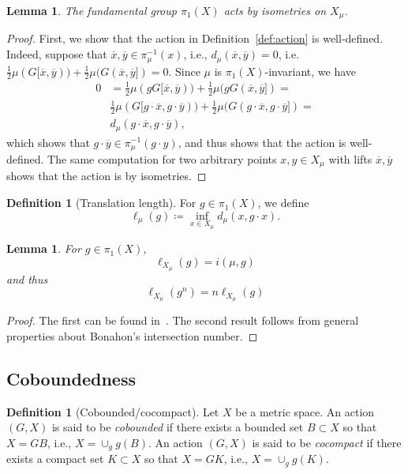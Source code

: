 \documentclass[12pt,article]{amsart}
\numberwithin{equation}{section}
\numberwithin{figure}{section}
\newtheorem{lemma}[equation]{Lemma}
\theoremstyle{definition}
\newtheorem{definition}[equation]{Definition}
\theoremstyle{plain}
\begin{document}
\begin{lemma}
The fundamental group $\pi_1(X)$ acts by isometries on $X_{\mu}$.
\end{lemma}
\begin{proof}
First, we show that the action in Definition~\ref{def:action} is well-defined. Indeed, suppose that $\overline{x},\overline{y} \in \pi_{\mu}^{-1}(x)$, i.e., $d_{\mu}(\overline{x},\overline{y})=0$,
i.e. $\frac{1}{2}\mu(G[\overline{x},\overline{y})) + \frac{1}{2}\mu(G(\overline{x},\overline{y}])=0$.
Since $\mu$ is $\pi_1(X)$-invariant,
we have
\begin{align*}0&=\frac{1}{2}\mu(g G[\overline{x},\overline{y})) + \frac{1}{2}\mu(g G(\overline{x},\overline{y}])=\\
& \frac{1}{2}\mu( G[g \cdot \overline{x},g \cdot\overline{y})) + \frac{1}{2}\mu( G(g \cdot \overline{x},g \cdot \overline{y}])=\\
& d_{\mu}(g \cdot \overline{x},g \cdot \overline{y}),
\end{align*}
which shows that 
$g \cdot \overline{y} \in \pi_{\mu}^{-1}(g \cdot y)$, and thus shows that the action is well-defined.
The same computation for two arbitrary points $x,y \in X_{\mu}$ with lifts $\overline{x},\overline{y}$ shows that the action is by isometries.
\end{proof}

\begin{definition}[Translation length]
For $g \in \pi_1(X)$, we define \[\ell_{\mu}(g) \coloneqq \inf_{x \in X_{\mu}} d_{\mu}(x,g\cdot x).\]
 \end{definition}
\begin{lemma}
For $g \in \pi_1(X)$,
\[
\ell_{X_{\mu}}(g)=i(\mu,g)
\]
and thus 
\[
\ell_{X_{\mu}}(g^n)=n \ell_{X_{\mu}}(g)
\]
\label{lem:lenvsint}
\end{lemma}
\begin{proof}
The first can be found in~\cite[Lemma~4.7]{BIPP21:Currents}.
 The second result follows from general properties about Bonahon's intersection number.
\end{proof}



\subsection{Coboundedness} 

\begin{definition}[Cobounded/cocompact]
Let $X$ be a metric space.  An action $(G,X)$ is said to be \emph{cobounded} if there exists a bounded set $B \subset X$ so that $X=G B$, i.e., $X=\cup_g g(B)$. An action $(G,X)$ is said to be \emph{cocompact} if there exists a compact set $K \subset X$ so that $X=G K$, i.e., $X=\cup_g g(K)$.
\end{definition}
\end{document}
